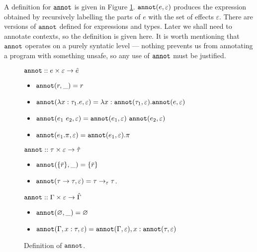 A definition for $\mathtt{annot}$ is given in Figure \ref{fig:annot_defn}. $\mathtt{annot}(e, \varepsilon)$ produces the expression obtained by recursively labelling the parts of $e$ with the set of effects $\varepsilon$. There are versions of $\mathtt{annot}$ defined for expressions and types. Later we shall need to annotate contexts, so the definition is given here. It is worth mentioning that $\mathtt{annot}$ operates on a purely syntatic level --- nothing prevents us from annotating a program with something unsafe, so any use of $\mathtt{annot}$ must be justified.

\begin{figure}[h]
\vspace{-5pt}

$\mathtt{annot} :: e \times \varepsilon \rightarrow \hat e$

\begin{itemize}
	\setlength\itemsep{-0.2em}
	\item[] $\mathtt{annot}(r, \_) = r$
	\item[] $\mathtt{annot}(\lambda x: \tau_1 . e, \varepsilon) = \lambda x: \mathtt{annot}(\tau_1, \varepsilon) . \mathtt{annot}(e, \varepsilon)$
	\item[] $\mathtt{annot}(e_1~e_2, \varepsilon) = \mathtt{annot}(e_1, \varepsilon)~\mathtt{annot}(e_2, \varepsilon)$
	\item[] $\mathtt{annot}(e_1.\pi, \varepsilon) = \mathtt{annot}(e_1, \varepsilon).\pi$
\end{itemize}
	
$\mathtt{annot} :: \tau \times \varepsilon \rightarrow \hat \tau$

\begin{itemize}
	\setlength\itemsep{-0.2em}
	\item[] $\mathtt{annot}(\{ \bar r \}, \_) = \{ \bar r \}$
	\item[] $\mathtt{annot}(\tau \rightarrow \tau, \varepsilon) = \tau \rightarrow_{\varepsilon} \tau$.	
\end{itemize}

$\mathtt{annot} :: \Gamma \times \varepsilon \rightarrow \hat \Gamma$

\begin{itemize}
	\setlength\itemsep{-0.2em}
	\item[] $\mathtt{annot}(\varnothing, \_) = \varnothing$
	\item[] $\mathtt{annot}(\Gamma, x: \tau, \varepsilon) = \mathtt{annot}(\Gamma, \varepsilon), x: \mathtt{annot}(\tau, \varepsilon)$
\end{itemize}

\vspace{-7pt}
\caption{Definition of $\mathtt{annot}$.}
\label{fig:annot_defn}
\end{figure}


